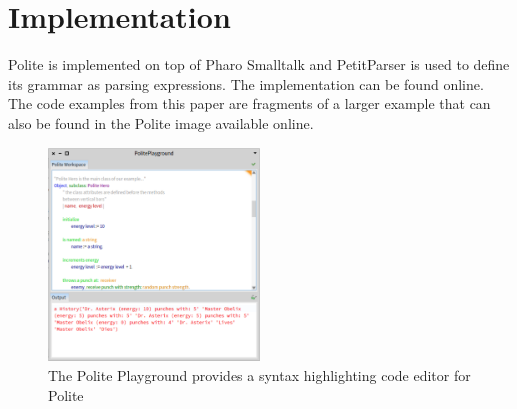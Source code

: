 
\section{Implementation}
Polite is implemented on top of Pharo Smalltalk and PetitParser is used to define its grammar as parsing expressions. The implementation can be found online. The code examples from this paper are fragments of a larger example that can also be found in the Polite image available online. 

\begin{figure}[h]
	\centering
	\includegraphics[width=0.5\textwidth]{images/playground.png}
	\caption{The Polite Playground provides a syntax highlighting code editor for Polite}
	\label{fig:figure1}
\end{figure}
